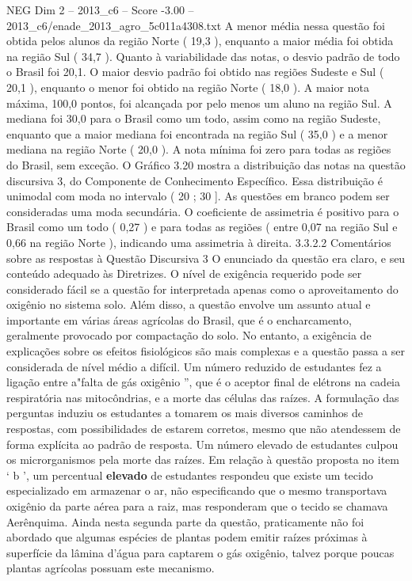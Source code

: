 \begin{textsample}{NEG Dim 2 – 2013\_c6 – Score -3.00 – 2013\_c6/enade\_2013\_agro\_5c011a4308.txt}
A menor média nessa questão foi obtida pelos alunos da região Norte ( 19,3 ), enquanto a maior média foi obtida na região Sul ( 34,7 ).
Quanto à variabilidade das notas, o desvio padrão de todo o Brasil foi 20,1.
O maior desvio padrão foi obtido nas regiões Sudeste e Sul ( 20,1 ), enquanto o menor foi obtido na região Norte ( 18,0 ).
A maior nota máxima, 100,0 pontos, foi alcançada por pelo menos um aluno na região Sul.
A mediana foi 30,0 para o Brasil como um todo, assim como na região Sudeste, enquanto que a maior mediana foi encontrada na região Sul ( 35,0 ) e a menor mediana na região Norte ( 20,0 ).
A nota mínima foi zero para todas as regiões do Brasil, sem exceção.
O Gráfico 3.20 mostra a distribuição das notas na questão discursiva 3, do Componente de Conhecimento Específico.
Essa distribuição é unimodal com moda no intervalo ( 20 ; 30 ].
As questões em branco podem ser consideradas uma moda secundária.
O coeficiente de assimetria é positivo para o Brasil como um todo ( 0,27 ) e para todas as regiões ( entre 0,07 na região Sul e 0,66 na região Norte ), indicando uma assimetria à direita. 3.3.2.2 Comentários sobre as respostas à Questão Discursiva 3 O enunciado da questão era claro, e seu conteúdo adequado às Diretrizes.
O nível de exigência requerido pode ser considerado fácil se a questão for interpretada apenas como o aproveitamento do oxigênio no sistema solo.
Além disso, a questão envolve um assunto atual e importante em várias áreas agrícolas do Brasil, que é o encharcamento, geralmente provocado por compactação do solo.
No entanto, a exigência de explicações sobre os efeitos fisiológicos são mais complexas e a questão passa a ser considerada de nível médio a difícil.
Um número reduzido de estudantes fez a ligação entre a"falta de gás oxigênio ”, que é o aceptor final de elétrons na cadeia respiratória nas mitocôndrias, e a morte das células das raízes.
A formulação das perguntas induziu os estudantes a tomarem os mais diversos caminhos de respostas, com possibilidades de estarem corretos, mesmo que não atendessem de forma explícita ao padrão de resposta.
Um número elevado de estudantes culpou os microrganismos pela morte das raízes.
Em relação à questão proposta no item ‘ b ’, um percentual \textbf{elevado} de estudantes respondeu que existe um tecido especializado em armazenar o ar, não especificando que o mesmo transportava oxigênio da parte aérea para a raiz, mas responderam que o tecido se chamava Aerênquima.
Ainda nesta segunda parte da questão, praticamente não foi abordado que algumas espécies de plantas podem emitir raízes próximas à superfície da lâmina d'água para captarem o gás oxigênio, talvez porque poucas plantas agrícolas possuam este mecanismo.

\end{textsample}
